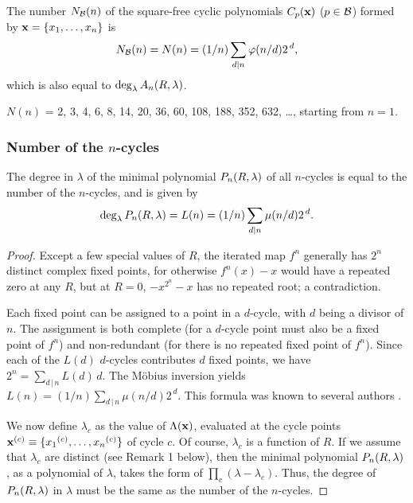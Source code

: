 \documentclass[preprint]{revtex4-1}
\begin{document}
\begin{theorem}
The number $N_\mathcal B(n)$ of the square-free cyclic polynomials $C_p(\mathbf{x})$ ($p \in \mathcal B$)
  formed by $\mathbf{x} = \{x_1, \ldots, x_n\}$ is
\begin{equation}
  N_\mathcal B(n) = N(n) = (1/n) \sum_{d|n} \varphi(n/d) 2^{\,d},
\label{eq:necklace}
\end{equation}
%
which is also equal to $\deg_\lambda A_n(R, \lambda)$.
\label{thm:necklace}
\end{theorem}
%
$N(n)$ = 2, 3, 4, 6, 8, 14, 20, 36, 60, 108, 188, 352, 632, \ldots, starting from $n = 1$.



\subsubsection{Number of the $n$-cycles}


\begin{theorem}
The degree in $\lambda$ of the minimal polynomial $P_n(R, \lambda)$ of all $n$-cycles
  is equal to the number of the $n$-cycles,
  and is given by
\begin{equation}
  \deg_\lambda P_n(R, \lambda) = L(n) = (1/n)\sum_{d | n} \mu(n/d) 2^{\,d}.
\label{eq:lyndon}
\end{equation}
\label{thm:lyndon}
\end{theorem}



\begin{proof}
%
Except a few special values of $R$,
the iterated map $f^{n}$ generally
has $2^n$ distinct complex fixed points,
%
for otherwise $f^{n}(x) - x$ would have a repeated zero at any $R$,
  but at $R=0$, $-x^{2^n} - x$ has no repeated root; a contradiction.


Each fixed point can be assigned to
  a point in a $d$-cycle, with $d$ being a divisor of $n$.
%
The assignment
  is both complete (for a $d$-cycle point
  must also be a fixed point of $f^n$)
  and non-redundant (for there is no
  repeated fixed point of $f^n$).
%
Since each of the $L(d)$ $d$-cycles
  contributes $d$ fixed points,
we have
$2^n = \sum_{d\,|\,n} L(d) \, d$.
%
The M\"obius inversion yields $L(n) = (1/n) \sum_{d\,|\,n} \mu(n/d) 2^{\,d}$.
This formula was known to several authors \cite{hao, lutzky}.

We now define $\lambda_c$ as the value of $\Lambda(\mathbf{x})$,
  evaluated at the cycle points
  $\mathbf{x}^{(c)} \equiv \{ {x_1}^{(c)}, \ldots, {x_n}^{(c)} \}$
  of cycle $c$.
Of course, $\lambda_c$ is a function of $R$.
If we assume that $\lambda_c$ are distinct (see Remark 1 below),
  then the minimal polynomial $P_n(R, \lambda)$,
  as a polynomial of $\lambda$,
  takes the form of $\prod_c (\lambda - \lambda_c)$.
Thus, the degree of $P_n(R, \lambda)$ in $\lambda$
  must be the same as the number of the $n$-cycles.
\end{proof}
\end{document}
